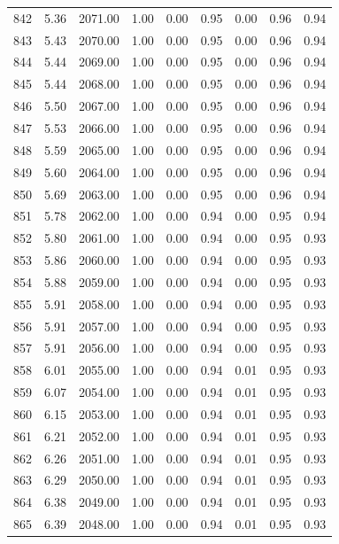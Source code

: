 \documentclass{article}\usepackage[]{graphicx}\usepackage[]{color}
\begin{document}
\begin{longtable}{rrrrrrrrr}
  842 & 5.36 & 2071.00 & 1.00 & 0.00 & 0.95 & 0.00 & 0.96 & 0.94 \\ 
  843 & 5.43 & 2070.00 & 1.00 & 0.00 & 0.95 & 0.00 & 0.96 & 0.94 \\ 
  844 & 5.44 & 2069.00 & 1.00 & 0.00 & 0.95 & 0.00 & 0.96 & 0.94 \\ 
  845 & 5.44 & 2068.00 & 1.00 & 0.00 & 0.95 & 0.00 & 0.96 & 0.94 \\ 
  846 & 5.50 & 2067.00 & 1.00 & 0.00 & 0.95 & 0.00 & 0.96 & 0.94 \\ 
  847 & 5.53 & 2066.00 & 1.00 & 0.00 & 0.95 & 0.00 & 0.96 & 0.94 \\ 
  848 & 5.59 & 2065.00 & 1.00 & 0.00 & 0.95 & 0.00 & 0.96 & 0.94 \\ 
  849 & 5.60 & 2064.00 & 1.00 & 0.00 & 0.95 & 0.00 & 0.96 & 0.94 \\ 
  850 & 5.69 & 2063.00 & 1.00 & 0.00 & 0.95 & 0.00 & 0.96 & 0.94 \\ 
  851 & 5.78 & 2062.00 & 1.00 & 0.00 & 0.94 & 0.00 & 0.95 & 0.94 \\ 
  852 & 5.80 & 2061.00 & 1.00 & 0.00 & 0.94 & 0.00 & 0.95 & 0.93 \\ 
  853 & 5.86 & 2060.00 & 1.00 & 0.00 & 0.94 & 0.00 & 0.95 & 0.93 \\ 
  854 & 5.88 & 2059.00 & 1.00 & 0.00 & 0.94 & 0.00 & 0.95 & 0.93 \\ 
  855 & 5.91 & 2058.00 & 1.00 & 0.00 & 0.94 & 0.00 & 0.95 & 0.93 \\ 
  856 & 5.91 & 2057.00 & 1.00 & 0.00 & 0.94 & 0.00 & 0.95 & 0.93 \\ 
  857 & 5.91 & 2056.00 & 1.00 & 0.00 & 0.94 & 0.00 & 0.95 & 0.93 \\ 
  858 & 6.01 & 2055.00 & 1.00 & 0.00 & 0.94 & 0.01 & 0.95 & 0.93 \\ 
  859 & 6.07 & 2054.00 & 1.00 & 0.00 & 0.94 & 0.01 & 0.95 & 0.93 \\ 
  860 & 6.15 & 2053.00 & 1.00 & 0.00 & 0.94 & 0.01 & 0.95 & 0.93 \\ 
  861 & 6.21 & 2052.00 & 1.00 & 0.00 & 0.94 & 0.01 & 0.95 & 0.93 \\ 
  862 & 6.26 & 2051.00 & 1.00 & 0.00 & 0.94 & 0.01 & 0.95 & 0.93 \\ 
  863 & 6.29 & 2050.00 & 1.00 & 0.00 & 0.94 & 0.01 & 0.95 & 0.93 \\ 
  864 & 6.38 & 2049.00 & 1.00 & 0.00 & 0.94 & 0.01 & 0.95 & 0.93 \\ 
  865 & 6.39 & 2048.00 & 1.00 & 0.00 & 0.94 & 0.01 & 0.95 & 0.93 \\ 

\end{longtable}
\end{document}
